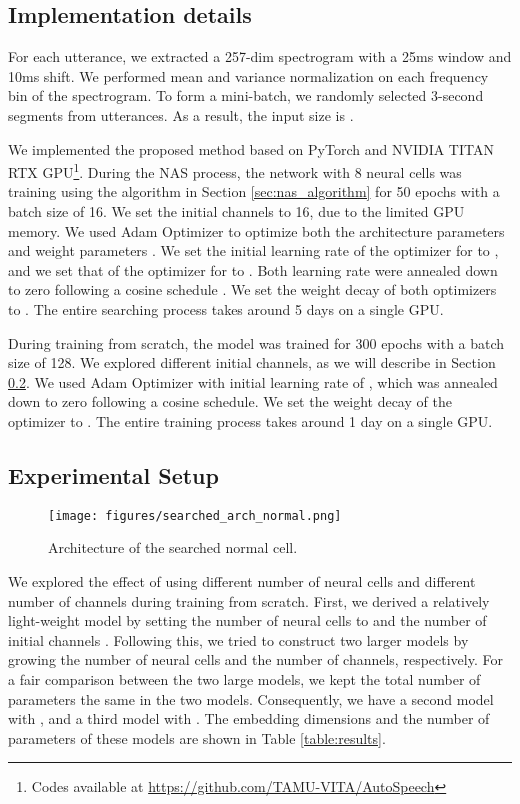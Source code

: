 \documentclass[a4paper]{article}
\begin{document}
\subsection{Implementation details}
For each utterance, we extracted a 257-dim spectrogram with a 25ms window and 10ms shift. We performed mean and variance normalization on each frequency bin of the spectrogram. To form a mini-batch, we randomly selected 3-second segments from utterances. As a result, the input size is . 

We implemented the proposed method based on PyTorch \cite{paszke2017automatic} and NVIDIA TITAN RTX GPU\footnote{Codes available at \url{https://github.com/TAMU-VITA/AutoSpeech}}. During the NAS process, the network with 8 neural cells was training using the algorithm in Section \ref{sec:nas_algorithm} for 50 epochs with a batch size of 16. We set the initial channels to 16, due to the limited GPU memory. We used Adam Optimizer to optimize both the architecture parameters  and weight parameters . We set the initial learning rate of the optimizer for  to , and we set that of the optimizer for  to . Both learning rate were annealed down to zero following a cosine schedule \cite{loshchilov2016sgdr}. We set the weight decay of both optimizers to . The entire searching process takes around 5 days on a single GPU.

During training from scratch, the model was trained for 300 epochs with a batch size of 128. We explored different initial channels, as we will describe in Section \ref{sec:setup}. We used Adam Optimizer with initial learning rate of , which was annealed down to zero following a cosine schedule. We set the weight decay of the optimizer to . The entire training process takes around 1 day on a single GPU.

\subsection{Experimental Setup}
\label{sec:setup}

\begin{figure}
	\centering
	\texttt{[image: figures/searched\_arch\_normal.png]}
	\caption{Architecture of the searched normal cell.}
	\vspace{-1em}
	\label{fig:vis_normal}
\end{figure}



We explored the effect of using different number of neural cells and different number of channels during training from scratch. First, we derived a relatively light-weight model by setting the number of neural cells to  and the number of initial channels . Following this, we tried to construct two larger models by growing the number of neural cells and the number of channels, respectively. For a fair comparison between the two large models, we kept the total number of parameters the same in the two models. Consequently, we have a second model with , and a third model with . The embedding dimensions and the number of parameters of these models are shown in Table \ref{table:results}.
\end{document}
